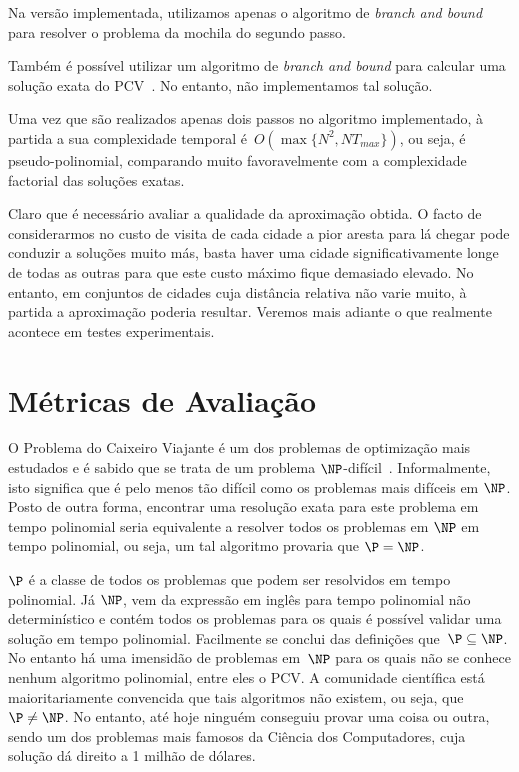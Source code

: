 \documentclass[12pt,a4paper,reqno]{report}
\numberwithin{equation}{section}
\begin{document}
Na versão implementada, utilizamos apenas o algoritmo de \emph{branch and bound} para resolver o problema da mochila do segundo passo.

Também é possível utilizar um algoritmo de \emph{branch and bound} para calcular uma solução exata do PCV~\cite{tube_bnb_tsp_1, tube_bnb_tsp_2, Narahari:2000}. No entanto, não implementamos tal solução.

Uma vez que são realizados apenas dois passos no algoritmo implementado, à partida a sua complexidade temporal é~$O(\max\{N^2,NT_{max}\})$, ou seja, é pseudo-polinomial, comparando muito favoravelmente com a complexidade factorial das soluções exatas. 

Claro que é necessário avaliar a qualidade da aproximação obtida. O facto de considerarmos no custo de visita de cada cidade a pior aresta para lá chegar pode conduzir a soluções muito más, basta haver uma cidade significativamente longe de todas as outras para que este custo máximo fique demasiado elevado. No entanto, em conjuntos de cidades cuja distância relativa não varie muito, à partida a aproximação poderia resultar. Veremos mais adiante o que realmente acontece em testes experimentais.

\chapter{Métricas de Avaliação}

O Problema do Caixeiro Viajante é um dos problemas de optimização mais estudados e é sabido que se trata de um problema $\NP$-difícil~\cite{Garey&Johnson:1979, Papadimitriou:1994}. Informalmente, isto significa que é pelo menos tão difícil como os problemas mais difíceis em $\NP$. Posto de outra forma, encontrar uma resolução exata para este problema em tempo polinomial seria equivalente a resolver todos os problemas em $\NP$ em tempo polinomial, ou seja, um tal algoritmo provaria que $\P = \NP$.

$\P$ é a classe de todos os problemas que podem ser resolvidos em tempo polinomial. Já $\NP$, vem da expressão em inglês para tempo polinomial não determinístico e contém todos os problemas para os quais é possível validar uma solução em tempo polinomial. Facilmente se conclui das definições que~$\P \subseteq \NP$. No entanto há uma imensidão de problemas em~$\NP$ para os quais não se conhece nenhum algoritmo polinomial, entre eles o PCV. A comunidade científica está maioritariamente convencida que tais algoritmos não existem, ou seja, que~$\P \neq \NP$. No entanto, até hoje ninguém conseguiu provar uma coisa ou outra, sendo um dos problemas mais famosos da Ciência dos Computadores, cuja solução dá direito a 1 milhão de dólares.
\end{document}
